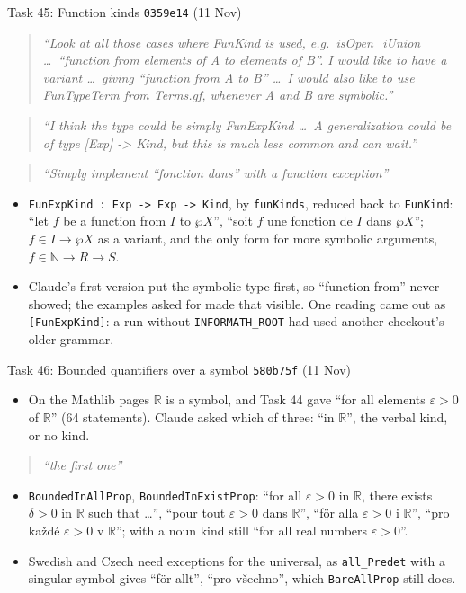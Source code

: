 \documentclass[10pt,aspectratio=169]{beamer}
\newcommand{\bad}[1]{\textcolor{warn}{#1}}
\newcommand{\ok}[1]{\textcolor{good}{#1}}
\newcommand{\commit}[1]{\texttt{\footnotesize #1}}
\newcommand{\prompt}[1]{\begin{quote}\small\itshape ``#1''\end{quote}}
\begin{document}
\begin{frame}{Task 45: Function kinds}
  \commit{0359e14} (11 Nov)
  \prompt{Look at all those cases where FunKind is used, e.g.\ isOpen\_iUnion \ldots\ ``function from
  elements of A to elements of B''. I would like to have a variant \ldots\ giving ``function from A
  to B'' \ldots\ I would also like to use FunTypeTerm from Terms.gf, whenever A and B are
  symbolic.}
  \prompt{I think the type could be simply FunExpKind \ldots\ A generalization could be of type
  [Exp] -> Kind, but this is much less common and can wait.}
  \prompt{Simply implement ``fonction dans'' with a function exception}
  \begin{itemize}\small
    \item \texttt{FunExpKind : Exp -> Exp -> Kind}, by \texttt{funKinds}, reduced back to
          \texttt{FunKind}: \ok{``let $f$ be a function from $I$ to $\wp X$''}, ``soit $f$ une
          fonction de $I$ dans $\wp X$''; $f \in I \rightarrow \wp X$ as a variant, and the only
          form for more symbolic arguments, $f \in \mathbb{N} \rightarrow R \rightarrow S$.
    \item Claude's first version put the symbolic type first, so ``function from'' never
          showed; the examples asked for made that visible. One reading came out as
          \bad{\texttt{[FunExpKind]}}: a run without \texttt{INFORMATH\_ROOT} had used another
          checkout's older grammar.
  \end{itemize}
\end{frame}

\begin{frame}{Task 46: Bounded quantifiers over a symbol}
  \commit{580b75f} (11 Nov)
  \begin{itemize}\small
    \item On the Mathlib pages $\mathbb{R}$ is a symbol, and Task 44 gave \bad{``for all elements
          $\varepsilon > 0$ of $\mathbb{R}$''} (64 statements). Claude asked which of three:
          ``in $\mathbb{R}$'', the verbal kind, or no kind.
  \end{itemize}
  \prompt{the first one}
  \begin{itemize}\small
    \item \texttt{BoundedInAllProp}, \texttt{BoundedInExistProp}: \ok{``for all $\varepsilon > 0$ in
          $\mathbb{R}$, there exists $\delta > 0$ in $\mathbb{R}$ such that \ldots''}, ``pour tout
          $\varepsilon > 0$ dans $\mathbb{R}$'', ``för alla $\varepsilon > 0$ i $\mathbb{R}$'', ``pro
          každé $\varepsilon > 0$ v $\mathbb{R}$''; with a noun kind still ``for all real numbers
          $\varepsilon > 0$''.
    \item Swedish and Czech need exceptions for the universal, as \texttt{all\_Predet} with a
          singular symbol gives \bad{``för allt''}, \bad{``pro všechno''}, which
          \texttt{BareAllProp} still does.
  \end{itemize}
\end{frame}
\end{document}
